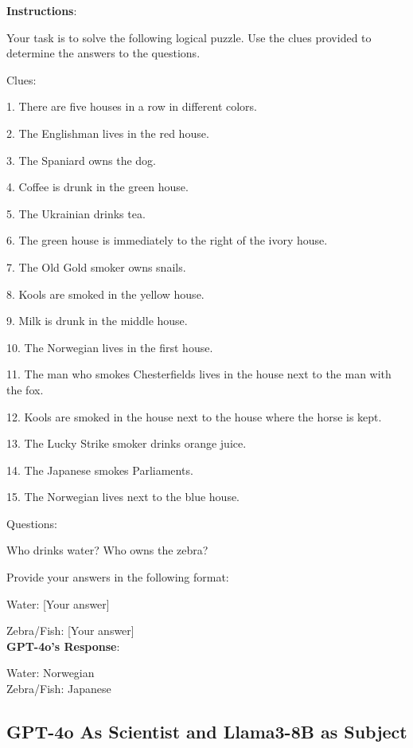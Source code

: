 \begin{tcolorbox}[breakable,boxrule=0.5pt,sharp corners,fontupper=\small,
colback=green!10, colframe=green!50!black, title={Success: Einstein's Riddle Variant Solved}]
\textbf{Instructions}:

Your task is to solve the following logical puzzle. Use the clues provided to determine the answers to the questions.

Clues:

1. There are five houses in a row in different colors.

2. The Englishman lives in the red house.

3. The Spaniard owns the dog.

4. Coffee is drunk in the green house.

5. The Ukrainian drinks tea.

6. The green house is immediately to the right of the ivory house.

7. The Old Gold smoker owns snails.

8. Kools are smoked in the yellow house.

9. Milk is drunk in the middle house.

10. The Norwegian lives in the first house.

11. The man who smokes Chesterfields lives in the house next to the man with the fox.

12. Kools are smoked in the house next to the house where the horse is kept.

13. The Lucky Strike smoker drinks orange juice.

14. The Japanese smokes Parliaments.

15. The Norwegian lives next to the blue house.

Questions:

Who drinks water? Who owns the zebra?

Provide your answers in the following format:

Water: [Your answer]

Zebra/Fish: [Your answer]\\

\textbf{GPT-4o's Response}:

Water: Norwegian\\
Zebra/Fish: Japanese
\end{tcolorbox}

\subsection{GPT-4o As Scientist and Llama3-8B as Subject}
\label{appsubsec:llama_manual_selection}

